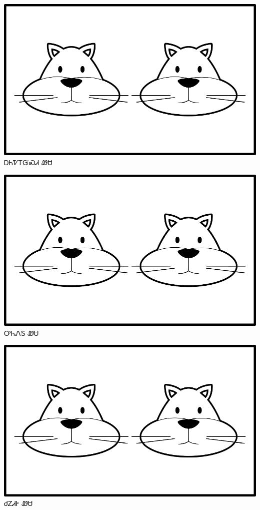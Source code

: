 \documentclass[avery5371]{flashcards}%
\begin{document}
    \begin{flashcard}{
        \includegraphics[width=0.95\columnwidth,height=.51\columnwidth,keepaspectratio]{../artwork/for-colors/wesa-anitali}
    }
        \Huge ᎠᏂᏤᎢᏳᏍᏗ ᏪᏌ
    \end{flashcard}

    \begin{flashcard}{
        \includegraphics[width=0.95\columnwidth,height=.51\columnwidth,keepaspectratio]{../artwork/for-colors/wesa-anitali}
    }
        \Huge ᎤᏂᏁᎦ ᏪᏌ
    \end{flashcard}

    \begin{flashcard}{
        \includegraphics[width=0.95\columnwidth,height=.51\columnwidth,keepaspectratio]{../artwork/for-colors/wesa-anitali}
    }
        \Huge ᏧᏃᏗᎨ ᏪᏌ
    \end{flashcard}
\end{document}
